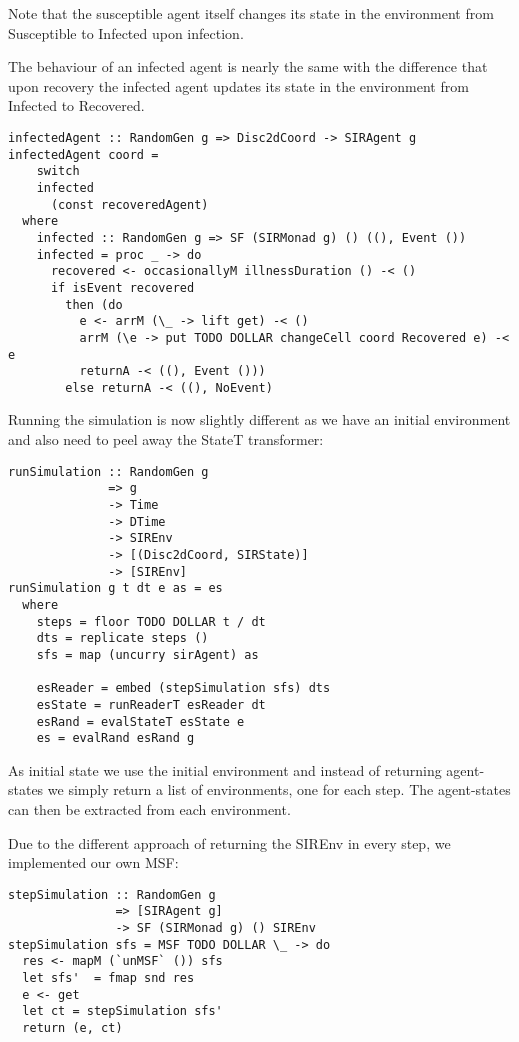 Note that the susceptible agent itself changes its state in the environment from Susceptible to Infected upon infection.

The behaviour of an infected agent is nearly the same with the difference that upon recovery the infected agent updates its state in the environment from Infected to Recovered.

\begin{verbatim}
infectedAgent :: RandomGen g => Disc2dCoord -> SIRAgent g
infectedAgent coord = 
    switch
    infected 
      (const recoveredAgent)
  where
    infected :: RandomGen g => SF (SIRMonad g) () ((), Event ())
    infected = proc _ -> do
      recovered <- occasionallyM illnessDuration () -< ()
      if isEvent recovered
        then (do
          e <- arrM (\_ -> lift get) -< ()
          arrM (\e -> put TODO DOLLAR changeCell coord Recovered e) -< e
          returnA -< ((), Event ()))
        else returnA -< ((), NoEvent)
\end{verbatim}

Running the simulation is now slightly different as we have an initial environment and also need to peel away the StateT transformer:
\begin{verbatim}
runSimulation :: RandomGen g
              => g 
              -> Time 
              -> DTime 
              -> SIREnv
              -> [(Disc2dCoord, SIRState)] 
              -> [SIREnv]
runSimulation g t dt e as = es
  where
    steps = floor TODO DOLLAR t / dt
    dts = replicate steps ()
    sfs = map (uncurry sirAgent) as

    esReader = embed (stepSimulation sfs) dts
    esState = runReaderT esReader dt
    esRand = evalStateT esState e
    es = evalRand esRand g
\end{verbatim}

As initial state we use the initial environment and instead of returning agent-states we simply return a list of environments, one for each step. The agent-states can then be extracted from each environment.

Due to the different approach of returning the SIREnv in every step, we implemented our own MSF:
\begin{verbatim}
stepSimulation :: RandomGen g
               => [SIRAgent g]
               -> SF (SIRMonad g) () SIREnv
stepSimulation sfs = MSF TODO DOLLAR \_ -> do
  res <- mapM (`unMSF` ()) sfs
  let sfs'  = fmap snd res
  e <- get
  let ct = stepSimulation sfs'
  return (e, ct) 
\end{verbatim}

